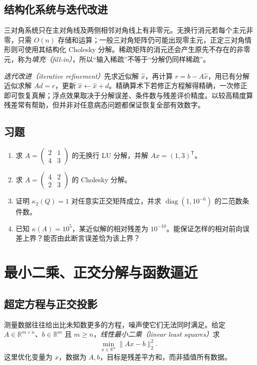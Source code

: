 \documentclass[UTF8,12pt,a4paper,fontset=fandol]{ctexbook}
\begin{document}
\section{结构化系统与迭代改进}
三对角系统只在主对角线及两侧相邻对角线上有非零元。无换行消元若每个主元非零，只需 $O(n)$ 存储和运算；一般三对角矩阵仍可能出现零主元，正定三对角情形则可使用其结构化 Cholesky 分解。稀疏矩阵的消元还会产生原先不存在的非零元，称为\emph{填充（fill-in）}，所以“输入稀疏”不等于“分解仍同样稀疏”。

\emph{迭代改进（iterative refinement）}先求近似解 $\widehat x$，再计算 $r=b-A\widehat x$，用已有分解近似求解 $Ad=r$，更新 $\widehat x\leftarrow\widehat x+d$。精确算术下若修正方程解得精确，一次修正即可恢复真解；浮点效果取决于分解误差、条件数与残差评价精度。以较高精度算残差常有帮助，但并非对任意病态问题都保证恢复全部有效数字。

\section{习题}
\begin{enumerate}[label=\arabic*.]
\item\label{exr:na-direct-lu} 求 $A=\begin{pmatrix}2&1\\4&3\end{pmatrix}$ 的无换行 LU 分解，并解 $Ax=(1,3)^{\mathsf T}$。
\item\label{exr:na-direct-cholesky} 求 $A=\begin{pmatrix}4&2\\2&3\end{pmatrix}$ 的 Cholesky 分解。
\item\label{exr:na-direct-condition} 证明 $\kappa_2(Q)=1$ 对任意实正交矩阵成立，并求 $\operatorname{diag}(1,10^{-6})$ 的二范数条件数。
\item\label{exr:na-direct-residual} 已知 $\kappa(A)=10^5$，某近似解的相对残差为 $10^{-10}$。能保证怎样的相对前向误差上界？能否由此断言误差恰为该上界？
\end{enumerate}

\chapter{最小二乘、正交分解与函数逼近}
\label{chap:na-ls}

\section{超定方程与正交投影}
测量数据往往给出比未知数更多的方程，噪声使它们无法同时满足。给定 $A\in\mathbb R^{m\times n}$、$b\in\mathbb R^m$ 且 $m\ge n$，\emph{线性最小二乘（linear least squares）}求
\begin{equation}
 \min_{x\in\mathbb R^n}\|Ax-b\|_2^2.
 \label{eq:na-ls-objective}
\end{equation}
这里优化变量为 $x$，数据为 $A,b$，目标是残差平方和，而非插值所有数据。
\end{document}
